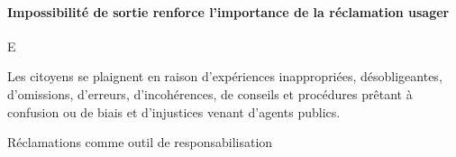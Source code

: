 \documentclass[a4paper,12pt, openany]{book}
\begin{document}
\paragraph{Impossibilité de sortie renforce l'importance de la réclamation usager} E










\textcite{brewer07} Les citoyens se plaignent en raison d'expériences inappropriées, désobligeantes, d'omissions, d'erreurs, d'incohérences, de conseils et procédures prêtant à confusion ou de biais et d'injustices venant d'agents publics.

Réclamations comme outil de responsabilisation 













\end{document}
